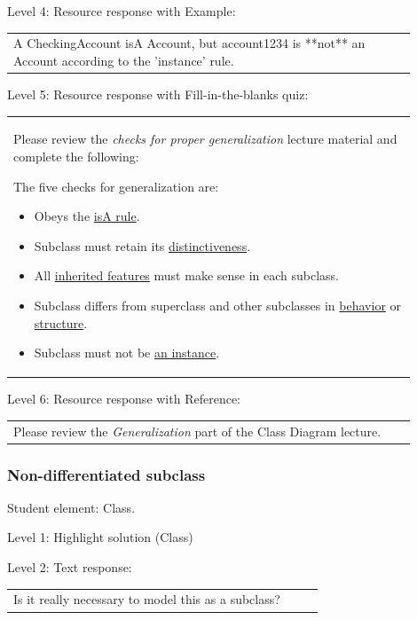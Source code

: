 \noindent Level 4: Resource response with Example: \medskip

\begin{tabular}{|p{0.9\linewidth}}
A CheckingAccount isA Account, but account1234 is **not** an Account according to the 'instance' rule.
\end{tabular} \medskip

\noindent Level 5: Resource response with Fill-in-the-blanks quiz: \medskip

\begin{tabular}{|p{0.9\linewidth}}

Please review the \textit{checks for proper generalization} lecture material
and complete the following:

The five checks for generalization are:

\begin{itemize}
    \item Obeys the \underline{isA rule}.
    \item Subclass must retain its \underline{distinctiveness}.
    \item All \underline{inherited features} must make sense in each subclass.
    \item Subclass differs from superclass and other subclasses in \underline{behavior} or \underline{structure}.
    \item Subclass must not be \underline{an instance}.
\end{itemize}

\end{tabular} \medskip

\noindent Level 6: Resource response with Reference: \medskip

\begin{tabular}{|p{0.9\linewidth}}
Please review the \textit{Generalization} part of the Class Diagram lecture.
\end{tabular} \medskip


\subsubsection{Non-differentiated subclass}

Student element: Class.  \medskip

\noindent Level 1: Highlight solution (Class) \medskip

\noindent Level 2: Text response: \medskip

\begin{tabular}{|p{0.9\linewidth}}
Is it really necessary to model this as a subclass?
\end{tabular} \medskip

